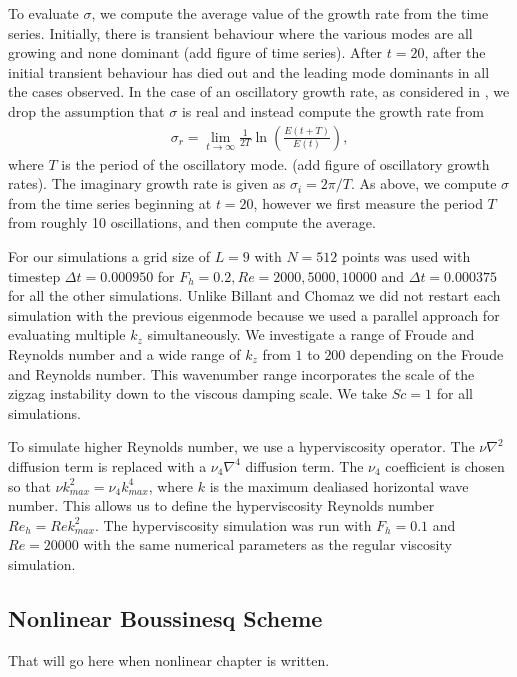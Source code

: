 To evaluate $\sigma$, we compute the average value of the growth rate from the time series. Initially, there is transient behaviour where the various modes are all growing and none dominant (add figure of time series). After $t=20$, after the initial transient behaviour has died out and the leading mode dominants in all the cases observed. In the case of an oscillatory growth rate, as considered in \cite{bc1999}, we drop the assumption that $\sigma$ is real and instead compute the growth rate from
\begin{align}
\sigma_{r} = \lim_{t\rightarrow \infty} \frac{1}{2T}\ln\left(\frac{E(t+T)}{E(t)}\right)\label{sigma2},
\end{align}
where $T$ is the period of the oscillatory mode. (add figure of oscillatory growth rates). The imaginary growth rate is given as $\sigma_{i}=2\pi/T$. As above, we compute $\sigma$ from the time series beginning at $t=20$, however we first measure the period $T$ from roughly 10 oscillations, and then compute the average.  

For our simulations a grid size of $L=9$ with $N=512$ points was used with timestep $\Delta t=0.000950$ for $F_{h}=0.2,Re=2000,5000,10000$ and $\Delta t=0.000375$ for all the other simulations. Unlike Billant and Chomaz\cite{bc2000c} we did not restart each simulation with the previous eigenmode because we used a parallel approach for evaluating multiple $k_{z}$ simultaneously. We investigate a range of Froude and Reynolds number and a wide range of $k_{z}$ from $1$ to $200$ depending on the Froude and Reynolds number. This wavenumber range incorporates the scale of the zigzag instability down to the viscous damping scale. We take $Sc=1$ for all simulations.  

To simulate higher Reynolds number, we use a hyperviscosity operator. The $\nu\nabla^{2}$ diffusion term is replaced with a $\nu_{4}\nabla^{4}$ diffusion term. The $\nu_{4}$ coefficient is chosen so that $\nu k_{max}^{2} = \nu_{4}k_{max}^{4}$, where $k$ is the maximum dealiased horizontal wave number. This allows us to define the hyperviscosity Reynolds number $Re_{h}=Re k_{max}^{2}$. The hyperviscosity simulation was run with $F_{h}=0.1$ and $Re=20000$ with the same numerical parameters as the regular viscosity simulation.

\subsection{Nonlinear Boussinesq Scheme}

That will go here when nonlinear chapter is written. 
